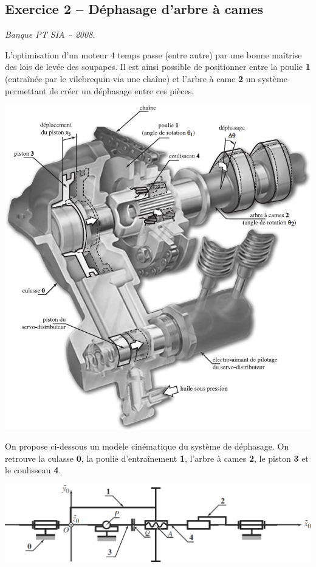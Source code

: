 \documentclass[10pt,fleqn]{article} %
\begin{document}
\begin{multicols}{2}
\subsection*{Exercice 2 -- Déphasage d'arbre à cames}
\setcounter{exo}{0}
\begin{flushright}
\textit{Banque PT SIA -- 2008.}
\end{flushright}

L'optimisation d'un moteur 4 temps passe (entre autre) par une bonne maîtrise des lois de levée des soupapes. Il est ainsi possible de positionner entre la poulie \textbf{1} (entraînée par le vilebrequin via une chaîne) et l'arbre à came  \textbf{2} un système permettant de créer un déphasage entre ces pièces. 

\begin{center}
\includegraphics[width=.9\linewidth]{images/calage_1.png}
\end{center}

On propose ci-dessous un modèle cinématique du système de déphasage. On retrouve la culasse \textbf{0}, la poulie d’entraînement \textbf{1}, l'arbre à cames \textbf{2}, le piston \textbf{3} et le coulisseau \textbf{4}. 


\begin{center}
\includegraphics[width=\linewidth]{images/calage_2.png}
\end{center}


\end{multicols}
\end{document}
